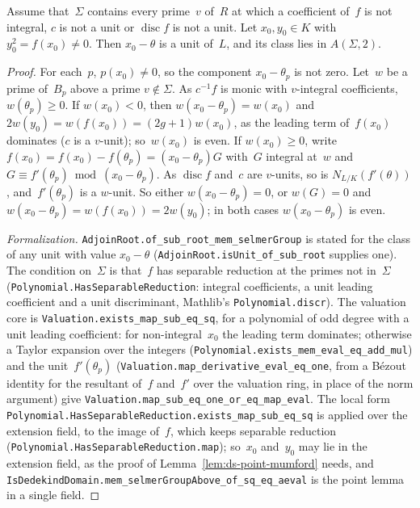 \begin{lemma}
\label{lem:ds-point}
\leanok
{}
Assume that~$\Sigma$ contains every prime~$v$ of~$R$ at which a coefficient of~$f$ is not
integral, $c$ is not a unit or $\operatorname{disc} f$ is not a unit. Let $x_0, y_0 \in K$ with
$y_0^2 = f(x_0) \ne 0$. Then $x_0 - \theta$ is a unit of~$L$, and its class lies in
$A(\Sigma, 2)$.
\end{lemma}

\begin{proof}
\leanok
For each~$p$, $p(x_0) \ne 0$, so the component $x_0 - \theta_p$ is not zero. Let~$w$ be a prime
of~$B_p$ above a prime $v \notin \Sigma$. As $c^{-1}f$ is monic with $v$-integral coefficients,
$w(\theta_p) \ge 0$. If $w(x_0) < 0$, then $w(x_0 - \theta_p) = w(x_0)$ and
$2w(y_0) = w(f(x_0)) = (2g + 1)w(x_0)$, as the leading term of~$f(x_0)$ dominates ($c$ is a
$v$-unit); so~$w(x_0)$ is even. If $w(x_0) \ge 0$, write
$f(x_0) = f(x_0) - f(\theta_p) = (x_0 - \theta_p)G$ with~$G$ integral at~$w$ and
$G \equiv f'(\theta_p) \bmod (x_0 - \theta_p)$. As $\operatorname{disc} f$ and~$c$ are $v$-units,
so is $N_{L/K}(f'(\theta))$, and~$f'(\theta_p)$ is a $w$-unit. So either $w(x_0 - \theta_p) = 0$,
or $w(G) = 0$ and $w(x_0 - \theta_p) = w(f(x_0)) = 2w(y_0)$; in both cases $w(x_0 - \theta_p)$ is
even.

\emph{Formalization.} \texttt{AdjoinRoot.of\_sub\_root\_mem\_selmerGroup} is stated for the class
of any unit with value $x_0 - \theta$ (\texttt{AdjoinRoot.isUnit\_of\_sub\_root} supplies one). The
condition on~$\Sigma$ is that~$f$ has separable reduction at the primes not in~$\Sigma$
(\texttt{Polynomial.HasSeparableReduction}: integral coefficients, a unit leading coefficient and a
unit discriminant, Mathlib's \texttt{Polynomial.discr}). The valuation core is
\texttt{Valuation.exists\_map\_sub\_eq\_sq}, for a polynomial of odd degree with a unit leading
coefficient: for non-integral~$x_0$ the leading term dominates; otherwise a Taylor expansion over
the integers (\texttt{Polynomial.exists\_mem\_eval\_eq\_add\_mul}) and the unit~$f'(\theta_p)$
(\texttt{Valuation.map\_derivative\_eval\_eq\_one}, from a B\'ezout identity for the resultant
of~$f$ and~$f'$ over the valuation ring, in place of the norm argument) give
\texttt{Valuation.map\_sub\_eq\_one\_or\_eq\_map\_eval}. The local form
\texttt{Polynomial.HasSeparableReduction.exists\_map\_sub\_eq\_sq} is applied over the extension
field, to the image of~$f$, which keeps separable reduction
(\texttt{Polynomial.HasSeparableReduction.map}); so~$x_0$ and~$y_0$ may lie in the extension field,
as the proof of Lemma~\ref{lem:ds-point-mumford} needs, and
\texttt{IsDedekindDomain.mem\_selmerGroupAbove\_of\_sq\_eq\_aeval} is the point lemma in a single
field.
\end{proof}

